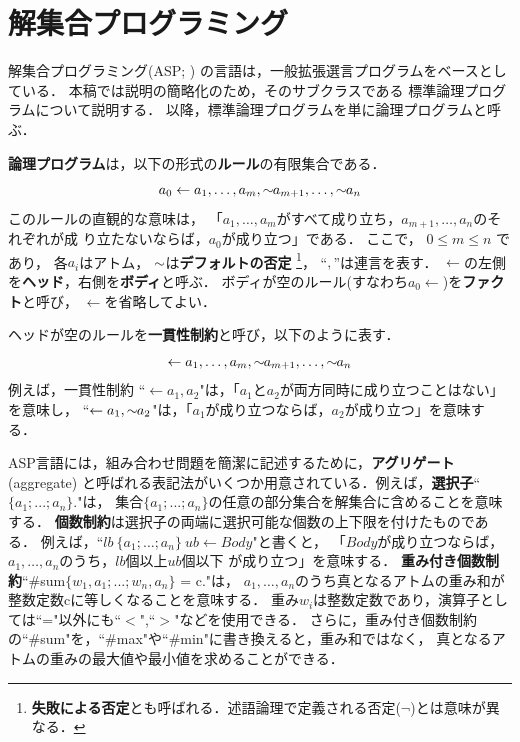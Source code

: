 \chapter{解集合プログラミング}\label{chap:asp}

解集合プログラミング(ASP; \cite{%
  Baral03:cambridge,%
  Gelfond88:iclp,%
  Inoue08:jssst})
の言語は，一般拡張選言プログラムをベースとしている．
本稿では説明の簡略化のため，そのサブクラスである
標準論理プログラムについて説明する．
以降，標準論理プログラムを単に論理プログラムと呼ぶ．

\textbf{論理プログラム}は，以下の形式の\textbf{ルール}の有限集合である．
\begin{equation}
  \label{eq:rule}
  a_0\leftarrow a_1,\dots,a_m,{\sim\!\!{a_{m+1}}},\dots,{\sim\!\!{a_n}}
\end{equation}
このルールの直観的な意味は，
「$a_1,\ldots,a_m$がすべて成り立ち，$a_{m+1},\ldots,a_n$のそれぞれが成
り立たないならば，$a_0$が成り立つ」である．
ここで，
$0\leq m\leq n$ であり，
各$a_i$はアトム，
${\sim\!\!{}}$は\textbf{デフォルトの否定}
\footnote{\textbf{失敗による否定}とも呼ばれる．述語論理で定義される否定($\neg$)とは意味が異なる．}，
``$,$''は連言を表す．
$\leftarrow$の左側を\textbf{ヘッド}，右側を\textbf{ボディ}と呼ぶ．
ボディが空のルール(すなわち\(a_0\leftarrow\))を\textbf{ファクト}と呼び，
$\leftarrow$を省略してよい．

ヘッドが空のルールを\textbf{一貫性制約}と呼び，以下のように表す．
\begin{equation}
  \label{eq:constr}
  \leftarrow a_1,\dots,a_m,{\sim\!\!{a_{m+1}}},\dots,{\sim\!\!{a_n}}
\end{equation}
例えば，一貫性制約
``\(\leftarrow a_1,a_2\)"は，「$a_1$と$a_2$が両方同時に成り立つことはない」を意味し，
``\(\leftarrow a_1, {\sim\!\!{a_{2}}}\)"は，「$a_1$が成り立つならば，$a_2$が成り立つ」を意味する．



ASP言語には，組み合わせ問題を簡潔に記述するために，\textbf{アグリゲート}(aggregate)
と呼ばれる表記法がいくつか用意されている．例えば，\textbf{選択子}``$\{a_1;...;a_n\}$."は，
集合\(\{a_1;...;a_n\}\)の任意の部分集合を解集合に含めることを意味する．
\textbf{個数制約}は選択子の両端に選択可能な個数の上下限を付けたものである．
例えば，``\(lb\ \{a_1;\dots;a_n\}\ ub \leftarrow Body\)"と書くと，
「$Body$が成り立つならば，$a_1,\dots,a_n$のうち，$lb$個以上$ub$個以下
が成り立つ」を意味する．
\textbf{重み付き個数制約}``\#sum\(\{w_1,a_1;...;w_n,a_n\}\) = c."は，
$a_1,\dots,a_n$のうち真となるアトムの重み和が整数定数cに等しくなることを意味する．
重み$w_i$は整数定数であり，演算子としては``="以外にも``$<$",``$>$"などを使用できる．
さらに，重み付き個数制約の``\#sum"を，``\#max"や``\#min"に書き換えると，重み和ではなく，
真となるアトムの重みの最大値や最小値を求めることができる．

